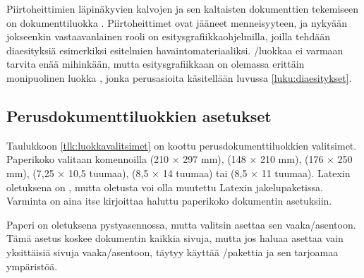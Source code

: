 Piirtoheittimien%
 läpinäkyvien kalvojen ja sen kaltaisten
dokumenttien tekemiseen on dokumenttiluokka .
Piirtoheittimet ovat jääneet menneisyyteen, ja nykyään jokseenkin
vastaavanlainen rooli on esi\-tys\-gra\-fiikka\-ohjel\-milla, joilla
tehdään dia\-esi\-tyk\-siä esimerkiksi esitelmien havaintomateriaaliksi.
\-/luokkaa ei varmaan tarvita enää mihinkään, mutta
esi\-tys\-gra\-fiik\-kaan on olemassa erittäin monipuolinen luokka
, jonka perus\-asioita käsitellään luvussa
\ref{luku:diaesitykset}.

\subsection{Perusdokumenttiluokkien asetukset}

Taulukkoon \ref{tlk:luokkavalitsimet}%
 on koottu perusdokumenttiluokkien valitsimet.
Paperikoko valitaan komennoilla  (210 × 297 mm),
 (148 × 210 mm),  (176 × 250 mm),
 (7,25 × 10,5 tuumaa), 
(8,5 × 14 tuumaa) tai  (8,5 × 11 tuumaa). Latexin
oletuksena on , mutta oletusta voi olla muutettu
Latexin jakelupaketissa. Varminta on aina itse kirjoittaa haluttu
paperikoko dokumentin asetuksiin.


Paperi%
 on oletuksena pysty\-asen\-nossa, mutta valitsin
 asettaa sen vaaka\-/asentoon. Tämä asetus koskee
dokumentin kaikkia sivuja, mutta jos haluaa asettaa vain yksittäisiä
sivuja vaaka\-/asentoon, täytyy käyttää \-/pakettia
ja sen tarjoamaa ympäristöä.

